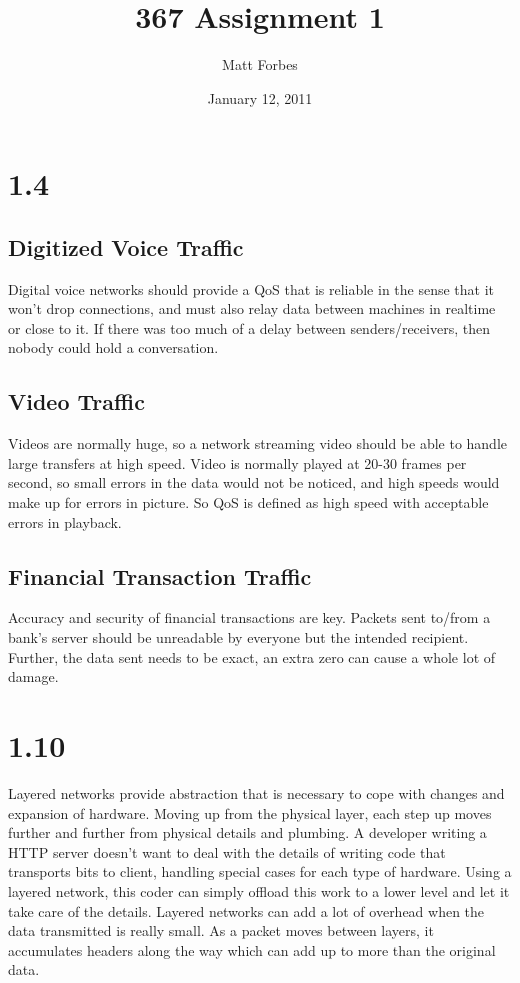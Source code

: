\documentclass[a4paper,12pt]{article}
\begin{document}
\title{367 Assignment 1}
\author{Matt Forbes}
\date{January 12, 2011}
\maketitle

\section*{1.4}

\subsection*{Digitized Voice Traffic}
Digital voice networks should provide a QoS that is reliable in the
sense that it won't drop connections, and must also relay data between
machines in realtime or close to it. If there was too much of a delay
between senders/receivers, then nobody could hold a conversation.

\subsection*{Video Traffic}
Videos are normally huge, so a network streaming video should be able
to handle large transfers at high speed. Video is normally played at
20-30 frames per second, so small errors in the data would not be
noticed, and high speeds would make up for errors in picture. So QoS
is defined as high speed with acceptable errors in playback.

\subsection*{Financial Transaction Traffic}
Accuracy and security of financial transactions are key. Packets sent
to/from a bank's server should be unreadable by everyone but the
intended recipient. Further, the data sent needs to be exact, an extra
zero can cause a whole lot of damage.

\section*{1.10}
Layered networks provide abstraction that is necessary to cope with
changes and expansion of hardware. Moving up from the physical layer,
each step up moves further and further from physical details and
plumbing. A developer writing a HTTP server doesn't want to deal with
the details of writing code that transports bits to client, handling
special cases for each type of hardware. Using a layered network, this
coder can simply offload this work to a lower level and let it take
care of the details. Layered networks can add a lot of overhead when
the data transmitted is really small. As a packet moves between
layers, it accumulates headers along the way which can add up to more
than the original data.
\end{document}
